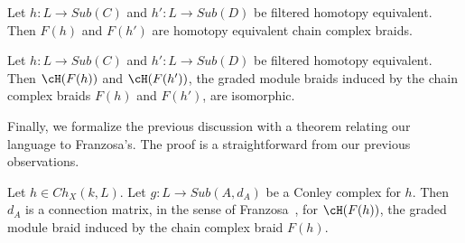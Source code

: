 \begin{prop}
Let $h:L\to Sub(C)$ and $h':L\to Sub(D)$ be filtered homotopy equivalent.  Then $F(h)$ and $F(h')$ are homotopy equivalent chain complex braids.
\end{prop}

\begin{cor}
Let $h:L\to Sub(C)$ and $h':L\to Sub(D)$ be filtered homotopy equivalent. Then $\cH(F(h))$ and $\cH(F(h'))$, the graded module braids induced by the chain complex braids $F(h)$ and $F(h')$, are isomorphic. 
\end{cor}


Finally, we formalize the previous discussion with a theorem relating our language to Franzosa's.  The proof is a straightforward from our previous observations.

\begin{thm}\label{thm:cfcm}
Let $h\in Ch_X(k,L)$.  Let $g:L\to Sub(A,d_A)$ be a Conley complex for $h$.  Then $d_A$ is a connection matrix, in the sense of Franzosa~\cite[Definition 3.6]{fran}, for $\cH(F(h))$, the graded module braid induced by the chain complex braid $F(h)$.
\end{thm}














